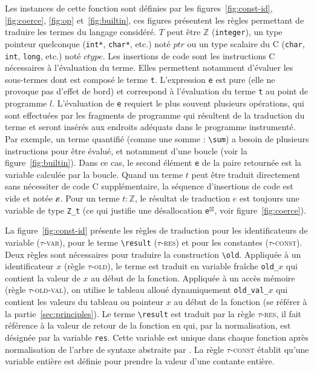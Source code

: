 Les instances de cette fonction sont définies par les
figures~\ref{fig:const-id}, \ref{fig:coerce}, \ref{fig:op} et~\ref{fig:builtin},
ces figures présentent les règles permettant de traduire les termes du langage
\eacsl considéré.
$T$ peut être $\mathbb{Z}$ (\lstinline'integer'), un type pointeur quelconque
(\lstinline'int*', \lstinline'char*', etc.) noté $ptr$ ou un type scalaire du C
(\lstinline'char', \lstinline'int', \lstinline'long', etc.) noté $ctype$.
Les insertions de code sont les instructions C nécessaires à l'évaluation du
terme.
Elles permettent notamment d'évaluer les sous-termes dont est composé le terme
\lstinline't'.
L'expression \lstinline'e' est pure (elle ne provoque pas d'effet de bord) et
correspond à l'évaluation du terme \lstinline't' au point de programme $l$.
L'évaluation de \lstinline'e' requiert le plus souvent plusieurs opérations,
qui sont effectuées par les fragments de programme qui résultent de la
traduction du terme et seront insérés aux endroits adéquats dans le programme
instrumenté.
Par exemple, un terme quantifié (comme une somme : \lstinline'\sum') a besoin de
plusieurs instructions pour être évalué, et notamment d'une boucle (voir la
figure~\ref{fig:builtin}).
Dans ce cas, le second élément \lstinline'e' de la paire retournée est la
variable calculée par la boucle.
Quand un terme $t$ peut être traduit directement sans nécessiter de code C
supplémentaire, la séquence d'insertions de code est vide et notée $\varepsilon$.
Pour un terme $t:\mathbb{Z}$, le résultat de traduction $e$ est toujours une
variable de type \lstinline'Z_t' (ce qui justifie une désallocation
\lstinline{e}${}^{\boxtimes}$, voir figure~\ref{fig:coerce}).



La figure~\ref{fig:const-id} présente les règles de traduction pour les
identificateurs de variable (\textsc{$\tau$-var}), pour le terme
\lstinline'\result' (\textsc{$\tau$-res}) et pour les constantes
(\textsc{$\tau$-const}).
Deux règles sont nécessaires pour traduire la construction \eacsl
\lstinline'\old'.
Appliquée à un identificateur $x$ (règle \textsc{$\tau$-old}), le terme est
traduit en variable fraîche \lstinline'old_'$x$ qui contient la valeur de $x$ au
début de la fonction.
Appliquée à un accès mémoire (règle \textsc{$\tau$-old-val}), on utilise le
tableau alloué dynamiquement \lstinline'old_val_'$x$ qui contient les valeurs du
tableau ou pointeur $x$ au début de la fonction (se référer à la
partie~\ref{sec:principles}).
Le terme \lstinline'\result' est traduit par la règle \textsc{$\tau$-res}, il
fait référence à la valeur de retour de la fonction en \eacsl qui, par la
normalisation, est désignée par la variable \lstinline'res'.
Cette variable est unique dans chaque fonction après normalisation de l'arbre de
syntaxe abstraite par \framac.
La règle \textsc{$\tau$-const} établit qu'une variable entière est définie pour
prendre la valeur d'une contante entière.

